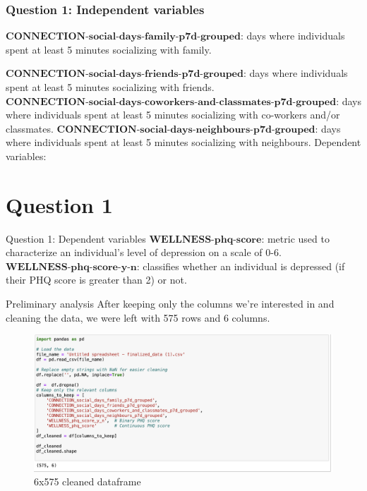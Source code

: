 \documentclass{beamer}
\begin{document}
\begin{frame}
\frametitle{Question 1: Independent variables}
$\textbf{CONNECTION-social-days-family-p7d-grouped}$: days where individuals spent at least 5 minutes socializing with family.

$\textbf{CONNECTION-social-days-friends-p7d-grouped}$: days where individuals spent at least 5 minutes socializing with friends.
$\textbf{CONNECTION-social-days-coworkers-and-classmates-p7d-grouped}$: days where individuals spent at least 5 minutes socializing with co-workers and/or classmates.
$\textbf{CONNECTION-social-days-neighbours-p7d-grouped}$: days where individuals spent at least 5 minutes socializing with neighbours.
Dependent variables:
\end{frame}

\section{Question 1}

\begin{frame}{Question 1: Dependent variables}
    $\textbf{WELLNESS-phq-score}$: metric used to characterize an individual's level of depression on a scale of 0-6.\\
    $\textbf{WELLNESS-phq-score-y-n}$: classifies whether an individual is depressed (if their PHQ score is greater than 2) or not.
\end{frame}

\begin{frame}{Preliminary analysis}
    After keeping only the columns we're interested in and cleaning the data, we were left with 575 rows and 6 columns.
\begin{figure}
    \centering
    \includegraphics[width=1\linewidth]{image.png}
    \caption{6x575 cleaned dataframe}
    \label{fig:enter-label}
\end{figure}
\end{frame}
\end{document}
